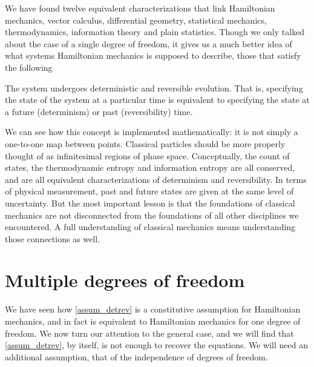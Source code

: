 We have found twelve equivalent characterizations that link Hamiltonian mechanics, vector calculus, differential geometry, statistical mechanics, thermodynamics, information theory and plain statistics. Though we only talked about the case of a single degree of freedom, it gives us a much better idea of what systems Hamiltonian mechanics is supposed to describe, those that satisfy the following
\renewcommand{\theassump}{DR}
\begin{assump}\label{assum_detrev}
	The system undergoes deterministic and reversible evolution. That is, specifying the state of the system at a particular time is equivalent to specifying the state at a future (determinism) or past (reversibility) time.
\end{assump}
\renewcommand{\theassump}{\Roman{assump}}
We can see how this concept is implemented mathematically: it is not simply a one-to-one map between points. Classical particles should be more properly thought of as infinitesimal regions of phase space. Conceptually, the count of states, the thermodynamic entropy and information entropy are all conserved, and are all equivalent characterizations of determinism and reversibility. In terms of physical measurement, past and future states are given at the same level of uncertainty. But the most important lesson is that the foundations of classical mechanics are not disconnected from the foundations of all other disciplines we encountered. A full understanding of classical mechanics means understanding those connections as well.

\section{Multiple degrees of freedom}

We have seen how \ref{assum_detrev} is a constitutive assumption for Hamiltonian mechanics, and in fact is equivalent to Hamiltonian mechanics for one degree of freedom. We now turn our attention to the general case, and we will find that \ref{assum_detrev}, by itself, is not enough to recover the equations. We will need an additional assumption, that of the independence of degrees of freedom.

